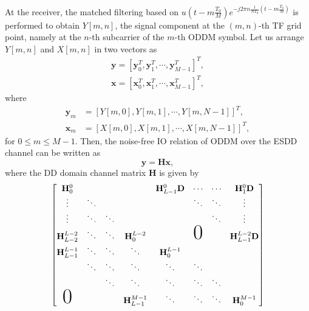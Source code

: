 \documentclass[journal]{IEEEtran}
\begin{document}
At the receiver, the matched filtering based on $u(t-m\frac{T_0}{M})e^{-j2\pi n \frac{1}{NT_0}(t-m\frac{T_0}{M})}$ is performed to obtain $Y[m,n]$, the signal component at the $(m,n)$-th TF grid point,  namely at the $n$-th subcarrier of the $m$-th ODDM symbol. Let us arrange $Y[m,n]$ and $X[m,n]$ in two vectors as
\begin{align*}
  \mathbf y  =  [\mathbf y_0^T,\mathbf y_1^T, \cdots, \mathbf y_{M-1}^T ]^T, \\
  \mathbf x  =  [\mathbf x_0^T,\mathbf x_1^T, \cdots, \mathbf x_{M-1}^T ]^T,
\end{align*}
where
\begin{align*}
  \mathbf y_m & =[Y[m,0],Y[m,1],\cdots,Y[m,N-1]]^T, \\
  \mathbf x_m & =[X[m,0],X[m,1],\cdots,X[m,N-1]]^T,
\end{align*}
for $0\le m \le M-1$.
Then, the noise-free IO relation of ODDM over the ESDD channel can be written as
\begin{equation} \label{ioddcompact}
  \mathbf y=\mathbf H \mathbf x,
\end{equation}
where the DD domain channel matrix $\mathbf H$ is given by
\begin{equation}\label{H}
  \begin{bmatrix}
    \mathbf H_0^0         &        &        &                       & \mathbf H_{L-1}^0 \mathbf D & \cdots         & \cdots & \mathbf H_{1}^0  \mathbf D      \\
    \vdots                & \ddots &        &                       &                             & \ddots         & \ddots & \vdots                          \\
    \vdots                & \ddots & \ddots &                       &                             &                & \ddots & \vdots                          \\
    \mathbf H_{L-2}^{L-2} & \ddots & \ddots & \mathbf H_{0}^{L-2}   &                             & \mbox{\Huge 0} &        & \mathbf H_{L-1}^{L-2} \mathbf D \\
    \mathbf H_{L-1}^{L-1} & \ddots & \ddots & \ddots                & \mathbf H_{0}^{L-1}         &                                                           \\
                          & \ddots & \ddots & \ddots                & \ddots                      & \ddots                                                    \\
                          &        & \ddots & \ddots                & \ddots                      & \ddots         & \ddots                                   \\
    \mbox{\Huge 0}        &        &        & \mathbf H_{L-1}^{M-1} & \ddots                      & \ddots         & \ddots & \mathbf H_{0}^{M-1}
  \end{bmatrix}
\end{equation}
\end{document}
